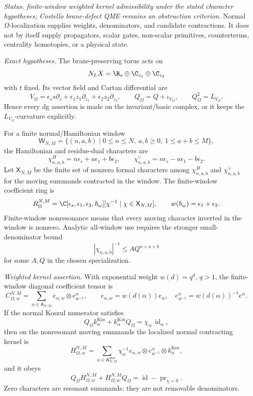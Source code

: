 \begin{stmt}\label{thm:lane-omega-weighted-kernel-qme-surface}
  \emph{Status.} \emph{finite-window weighted kernel admissibility under
  the stated character hypotheses; Costello brane-defect QME remains an
  obstruction criterion}.  Normal \(\Omega\)-localization supplies
  weights, denominators, and candidate contractions.  It does not by
  itself supply propagators, scalar gates, non-scalar primitives,
  counterterms, centrality homotopies, or a physical state.

  \emph{Exact hypotheses.} The brane-preserving torus acts on
  \[
    N_LX=\R_s\oplus\C_{z_1}\oplus\C_{z_2}
  \]
  with \(t\) fixed.  Its vector field and Cartan differential are
  \[
    V_\Omega=
    \epsilon_s s\partial_s+
    \epsilon_1z_1\partial_{z_1}+
    \epsilon_2z_2\partial_{z_2},
    \qquad
    Q_\Omega=Q+\iota_{V_\Omega},
    \qquad
    Q_\Omega^2=L_{V_\Omega}.
  \]
  Hence every dg assertion is made on the invariant/basic complex, or it
  keeps the \(L_{V_\Omega}\)-curvature explicitly.

  For a finite normal/Hamiltonian window
  \[
    \mathsf W_{N,M}
    =
    \{(n,a,b)\mid 0\le n\le N,\ a,b\ge0,\ 1\le a+b\le M\},
  \]
  the Hamiltonian and residue-dual characters are
  \[
    \chi^H_{n,a,b}=n\epsilon_s+a\epsilon_1+b\epsilon_2,
    \qquad
    \chi^\vee_{n,a,b}=n\epsilon_s-a\epsilon_1-b\epsilon_2 .
  \]
  Let \(\mathsf X_{N,M}\) be the finite set of nonzero formal characters
  among \(\chi^H_{n,a,b}\) and \(\chi^\vee_{n,a,b}\) for the moving
  summands contracted in the window.  The finite-window coefficient ring
  is
  \[
    R_{\Omega}^{N,M}
    =
    \C[\epsilon_s,\epsilon_1,\epsilon_2,\hbar_\omega]
    [\chi^{-1}\mid \chi\in\mathsf X_{N,M}],
    \qquad
    w(\hbar_\omega)=\epsilon_1+\epsilon_2 .
  \]
  Finite-window nonresonance means that every moving character inverted
  in the window is nonzero.  Analytic all-window use requires the
  stronger small-denominator bound
  \[
    |\chi_{n,a,b}|^{-1}\le A Q^{n+a+b}
  \]
  for some \(A,Q\) in the chosen specialization.

  \emph{Weighted kernel assertion.} With exponential weight \(w(d)=q^d\),
  \(q>1\), the finite-window diagonal coefficient tensor is
  \[
    C_{\Omega,w}^{N,M}
    =
    \sum_{\alpha\in\mathsf A_{N,M}}
    e_{\alpha,w}\otimes e^\alpha_{w^{-1}},
    \qquad
    e_{\alpha,w}=w(d(\alpha))e_\alpha,\quad
    e^\alpha_{w^{-1}}=w(d(\alpha))^{-1}e^\alpha.
  \]
  If the normal Koszul numerator satisfies
  \[
    Q_\Omega k^{\mathrm{Kos}}_\alpha+
    k^{\mathrm{Kos}}_\alpha Q_\Omega
    =
    \chi_\alpha\,\operatorname{id}_\alpha,
  \]
  then on the nonresonant moving summands the localized normal
  contracting kernel is
  \[
    H_{\Omega,w}^{N,M}
    =
    \sum_{\alpha\in\mathsf A^{\mathrm{mov}}_{N,M}}
    \chi_\alpha^{-1}
    e_{\alpha,w}\otimes e^\alpha_{w^{-1}}
    \otimes k^{\mathrm{Kos}}_\alpha,
  \]
  and it obeys
  \[
    Q_\Omega H_{\Omega,w}^{N,M}
    +H_{\Omega,w}^{N,M}Q_\Omega
    =
    \operatorname{id}-\operatorname{pr}_{\chi=0}.
  \]
  Zero characters are resonant summands; they are not removable
  denominators.


\end{stmt}
